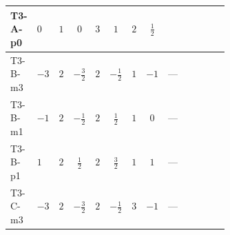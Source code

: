 \documentclass[8pt]{article}
\begin{document}
\begin{landscape}
\begin{longtable}{@{}llcccccc >{\raggedright\arraybackslash}p{0.21\linewidth} >{\raggedright\arraybackslash}p{0.21\linewidth} >{\raggedright\arraybackslash}p{0.21\linewidth}@{}}
\midrule
T3-A-p0 & $0$ & $1$ & $0$ & $3$ & $1$ & $2$ & $\frac{1}{2}$ & \scriptsize\adjustbox{max width=\linewidth}{$\begin{gathered} +\left({y_1}\,\left({y_1}\right)^{\dagger}\,{y_1}\right)_{ij}\end{gathered}$} & \scriptsize\adjustbox{max width=\linewidth}{$\begin{gathered} -\frac{9}{2} {g_2}^2 \left({y_1}\right)_{ij}\end{gathered}$} & \scriptsize\adjustbox{max width=\linewidth}{$\begin{gathered} -\frac{3}{2} {g_1}^2 \left({y_1}\right)_{ij}\end{gathered}$} \\
\midrule
T3-B-m3 & $-3$ & $2$ & $-\frac{3}{2}$ & $2$ & $-\frac{1}{2}$ & $1$ & $-1$ & --- & \scriptsize\adjustbox{max width=\linewidth}{$\begin{gathered} -\frac{9}{4} {g_2}^2 \left({y_1}\right)_{ij}\end{gathered}$} & \scriptsize\adjustbox{max width=\linewidth}{$\begin{gathered} -\frac{15}{4} {g_1}^2 \left({y_1}\right)_{ij}\end{gathered}$} \\
\midrule
T3-B-m1 & $-1$ & $2$ & $-\frac{1}{2}$ & $2$ & $\frac{1}{2}$ & $1$ & $0$ & --- & \scriptsize\adjustbox{max width=\linewidth}{$\begin{gathered} -\frac{9}{4} {g_2}^2 \left({y_1}\right)_{ij}\end{gathered}$} & \scriptsize\adjustbox{max width=\linewidth}{$\begin{gathered} -\frac{3}{4} {g_1}^2 \left({y_1}\right)_{ij}\end{gathered}$} \\
\midrule
T3-B-p1 & $1$ & $2$ & $\frac{1}{2}$ & $2$ & $\frac{3}{2}$ & $1$ & $1$ & --- & \scriptsize\adjustbox{max width=\linewidth}{$\begin{gathered} -\frac{9}{4} {g_2}^2 \left({y_1}\right)_{ij}\end{gathered}$} & \scriptsize\adjustbox{max width=\linewidth}{$\begin{gathered} -\frac{15}{4} {g_1}^2 \left({y_1}\right)_{ij}\end{gathered}$} \\
\midrule
T3-C-m3 & $-3$ & $2$ & $-\frac{3}{2}$ & $2$ & $-\frac{1}{2}$ & $3$ & $-1$ & --- & \scriptsize\adjustbox{max width=\linewidth}{$\begin{gathered} -\frac{33}{4} {g_2}^2 \left({y_1}\right)_{ij}\end{gathered}$} & \scriptsize\adjustbox{max width=\linewidth}{$\begin{gathered} -\frac{15}{4} {g_1}^2 \left({y_1}\right)_{ij}\end{gathered}$} \\

\end{longtable}
\end{landscape}
\end{document}
